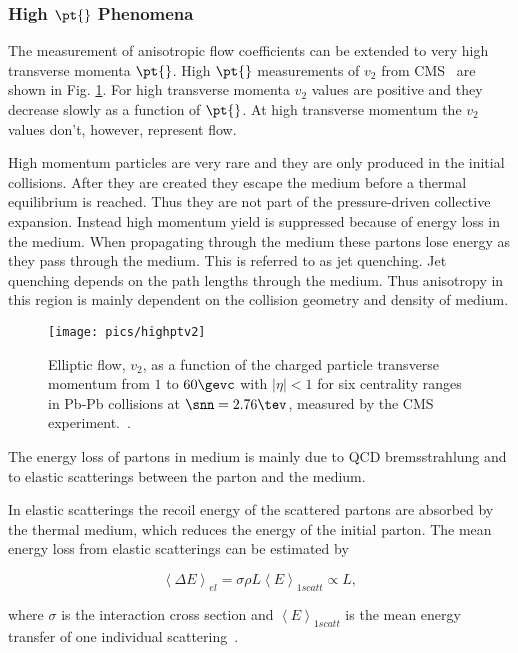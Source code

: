 \FloatBarrier

\subsubsection{High $\pt{}$ Phenomena}
The measurement of anisotropic flow coefficients can be extended to very high transverse momenta $\pt{}$. High $\pt{}$ measurements of $v_2$ from CMS~\cite{Chatrchyan:2012xq} are shown in Fig. \ref{fig:highpt}. For high transverse momenta $v_2$ values are positive and they decrease slowly as a function of $\pt{}$. At high transverse momentum the $v_2$ values don't, however, represent flow. 

High momentum particles are very rare and they are only produced in the initial collisions. After they are created they escape the medium before a thermal equilibrium is reached. Thus they are not part of the pressure-driven collective expansion. Instead high momentum yield is suppressed because of energy loss in the medium. When propagating through the medium these partons lose energy as they pass through the medium. This is referred to as jet quenching. Jet quenching depends on the path lengths through the medium. Thus anisotropy in this region is mainly dependent on the collision geometry and density of medium.

\begin{figure}
\centering
\texttt{[image: pics/highptv2]}
\caption[Elliptic flow, $v_2$ from $\pt{}=1$ to $60\gevc$]{ Elliptic flow, $v_2$, as a function of the charged particle transverse momentum from $1$ to $60\gevc$ with $\left|\eta\right|<1$ for six centrality ranges in Pb-Pb collisions at $\snn=2.76\tev$, measured by the CMS experiment.~\cite{Chatrchyan:2012xq}. }
\label{fig:highpt}
\end{figure}


The energy loss of partons in medium is mainly due to QCD bremsstrahlung and to elastic scatterings between the parton and the medium. 

In elastic scatterings the recoil energy of the scattered partons are absorbed by the thermal medium, which reduces the energy of the initial parton. The mean energy loss from elastic scatterings can be estimated by

\begin{equation}
\left<\Delta E\right>_{el}=\sigma \rho L \left<E\right>_{1 scatt}\propto L,
\end{equation}

\noindent where $\sigma$ is the interaction cross section and $\left<E\right>_{1 scatt}$ is the mean energy transfer of one individual scattering~\cite{Majumder:2010qh}.

